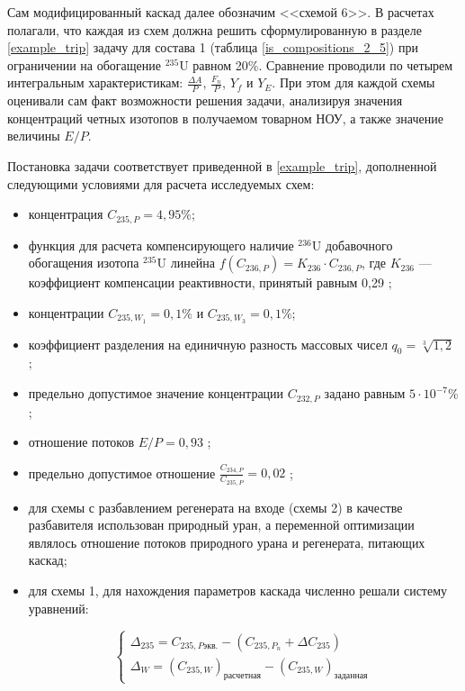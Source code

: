 Сам модифицированный каскад далее обозначим <<схемой 6>>. В расчетах полагали, что каждая из схем должна решить сформулированную в разделе \ref{example_trip} задачу для состава 1 (таблица \ref{is_compositions_2_5}) при ограничении на обогащение $^{235}$U равном 20\%. Сравнение проводили по четырем интегральным характеристикам: $\frac{\Delta A}{P}$, $\frac{F_n}{P}$, $Y_f$ и $Y_E$. При этом для каждой схемы оценивали сам факт возможности решения задачи, анализируя значения концентраций четных изотопов в получаемом товарном НОУ, а также значение величины $E/P$. 

Постановка задачи соответствует приведенной в \ref{example_trip}, дополненной следующими условиями для расчета исследуемых схем:

\begin{itemize}
    \item концентрация $C_{235,{P}} = {4,95\%}$; 
    \item функция для расчета компенсирующего наличие $^{236}$U добавочного обогащения изотопа $^{235}$U линейна $f(C_{236,P}) = {K_{236}\cdot{C_{236,{P}}}}$, где $K_{236}$ --- коэффициент компенсации реактивности, принятый равным 0,29 \cite{smirnovEvolutionIsotopicComposition2012};
    \item концентрации $C_{235,{W_1}} = 0,1\%$ и $C_{235,{W_3}} = 0,1\%$;
    \item коэффициент разделения на единичную разность массовых чисел $q_{0} = \sqrt[3]{1,2}$ \cite{smirnovEvolutionIsotopicComposition2012};
    \item предельно допустимое значение концентрации $C_{232,{P}}$ задано равным $5\cdot10^{-7} \%$;
    \item отношение потоков $E/P = 0,93$ \cite{2024smirnovObogashchenieRegenerirovannogoUrana2018};
    \item предельно допустимое отношение $\frac{C_{234,{P}}}{C_{235,{P}}} = 0,02$ \cite{2024smirnovObogashchenieRegenerirovannogoUrana2018};
    \item для схемы с разбавлением регенерата на входе (схемы 2) в качестве разбавителя использован природный уран, а переменной оптимизации являлось отношение потоков природного урана и регенерата, питающих каскад;
    \item для схемы 1, для нахождения параметров каскада численно решали систему уравнений:
    
    \begin{equation}\label{snau_sch1}
  \begin{cases}
  \Delta_{235}=C_{235,P\textit{экв.}}-(C_{235,{P_n}}+\Delta C_{235})\\
  \Delta_{W} = {(C_{235, W})}_{расчетная}-{(C_{235, W})}_{заданная}
  \end{cases}\,
\end{equation}
    

\end{itemize}
